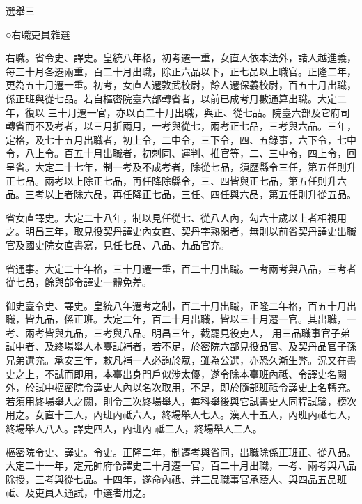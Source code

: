 
\begin{pinyinscope}

 選舉三



 ○右職吏員雜選



 右職。省令史、譯史。皇統八年格，初考遷一重，女直人依本法外，諸人越進義，每三十月各遷兩重，百二十月出職，除正六品以下，正七品以上職官。正隆二年，更為五十月遷一重。初考，女直人遷敦武校尉，餘人遷保義校尉，百五十月出職，係正班與從七品。若自樞密院臺六部轉省者，以前已成考月數通算出職。大定二年，復以
 三十月遷一官，亦以百二十月出職，與正、從七品。院臺六部及它府司轉省而不及考者，以三月折兩月，一考與從七，兩考正七品，三考與六品。三年，定格，及七十五月出職者，初上令，二中令，三下令，四、五錄事，六下令，七中令，八上令。百五十月出職者，初刺同、運判、推官等，二、三中令，四上令，回呈省。大定二十七年，制一考及不成考者，除從七品，須歷縣令三任，第五任則升正七品。兩考以上除正七品，再任降除縣令，三、四皆與正七品，第五任則升六品。三考以上者除六品，再任降正七品，三任、四任與六品，第五任則升從五品。



 省女直譯史。大定二十八年，制以見任從七、從八人內，勾六十歲以上者相視用之。明昌三年，取見役契丹譯史內女直、契丹字熟閑者，無則以前省契丹譯史出職官及國史院女直書寫，見任七品、八品、九品官充。



 省通事。大定二十年格，三十月遷一重，百二十月出職。一考兩考與八品，三考者從七品，餘與部令譯史一體免差。



 御史臺令史、譯史。皇統八年遷考之制，百二十月出職，正隆二年格，百五十月出職，皆九品，係正班。大定二年，百二十月出職，皆以三十月遷一官。其出職，一考、兩考皆與九品，三考與八品。明昌三年，截罷見役吏人，
 用三品職事官子弟試中者、及終場舉人本臺試補者，若不足，於密院六部見役品官、及契丹品官子孫兄弟選充。承安三年，敕凡補一人必詢於眾，雖為公選，亦恐久漸生弊。況又在書史之上，不試而即用，本臺出身門戶似涉太優，遂令除本臺班內祗、令譯史名闕外，於試中樞密院令譯史人內以名次取用，不足，即於隨部班祗令譯史上名轉充。若須用終場舉人之闕，則令三次終場舉人，每科舉後與它試書史人同程試驗，榜次用之。女直十三人，內班內祗六人，終場舉人七人。漢人十五人，內班內祗七人，終場舉人八人。譯史四人，內班內
 祗二人，終場舉人二人。



 樞密院令史、譯史。令史。正隆二年，制遷考與省同，出職除係正班正、從八品。大定二十一年，定元帥府令譯史三十月遷一官，百二十月出職，一考、兩考與八品除授，三考與從七品。十四年，遂命內祗、并三品職事官承蔭人、與四品五品班祗、及吏員人通試，中選者用之。




\end{pinyinscope}
